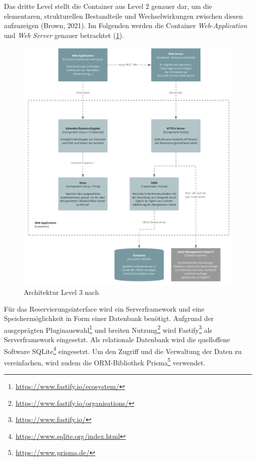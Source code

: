 {\sffamily\color{maincolor}{Level 3: Components}}

Das dritte Level stellt die Container aus Level 2 genauer dar, um die elementaren, strukturellen
Bestandteile und Wechselwirkungen zwischen diesen aufzuzeigen (Brown, 2021). Im Folgenden werden die
Container \textit{Web-Application} und \textit{Web Server} genauer betrachtet (\ref{fig:level3}).

\begin{figure}[h]
    \centering
    \includegraphics[scale=0.9]{Bilder/C4_3.pdf}
    \caption[Architektur Level 3]{Architektur Level 3 nach }
    \label{fig:level3}
\end{figure}

Für das Reservierungsinterface wird ein Serverframework und eine Speichermöglichkeit in Form einer
Datenbank benötigt. Aufgrund der ausgeprägten
Pluginauswahl\footnote{\url{https://www.fastify.io/ecosystem/}} und breiten
Nutzung\footnote{\url{https://www.fastify.io/organisations/}} wird
Fastify\footnote{\url{https://www.fastify.io/}} als Serverframework eingesetzt. Als relationale
Datenbank wird die quelloffene Software SQLite\footnote{\url{https://www.sqlite.org/index.html}}
eingesetzt. Um den Zugriff und die Verwaltung der Daten zu vereinfachen, wird zudem die
ORM-Bibliothek Prisma\footnote{\url{https://www.prisma.de/}}  verwendet.


